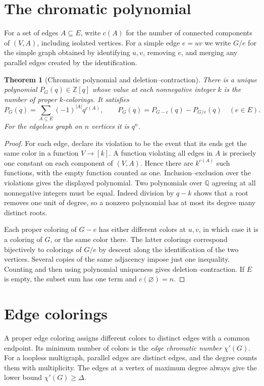 \documentclass[11pt,oneside,openany]{book}
\theoremstyle{plain}
\newtheorem{theorem}{Theorem}[chapter]
\theoremstyle{definition}
\theoremstyle{remark}
\begin{document}
\section{The chromatic polynomial}

For a set of edges \(A\subseteq E\), write \(c(A)\) for the number
of connected components of \((V,A)\), including isolated vertices.
For a simple edge \(e=uv\) we write \(G/e\) for the simple graph
obtained by identifying \(u,v\), removing \(e\), and merging any
parallel edges created by the identification.

\begin{theorem}[Chromatic polynomial and deletion--contraction]
\label{p204:W60}
There is a unique polynomial \(P_G(q)\in\mathbb Z[q]\) whose value
at each nonnegative integer \(k\) is the number of proper
\(k\)-colorings. It satisfies
\[
 P_G(q)=\sum_{A\subseteq E}(-1)^{|A|}q^{c(A)},\qquad
 P_G(q)=P_{G-e}(q)-P_{G/e}(q) \quad (e\in E).
\]
For the edgeless graph on \(n\) vertices it is \(q^n\).
\end{theorem}
\begin{proof}
For each edge, declare its violation to be the event that its ends
get the same color in a function \(V\to[k]\). A function violating
all edges in \(A\) is precisely one constant on each component of
\((V,A)\). Hence there are \(k^{c(A)}\) such functions, with the
empty function counted as one. Inclusion--exclusion over the
violations gives the displayed polynomial. Two polynomials over
\(\mathbb Q\) agreeing at all nonnegative integers must be equal.
Indeed division by \(q-k\) shows that a root removes one unit of
degree, so a nonzero polynomial has at most its degree many
distinct roots.

Each proper coloring of \(G-e\) has either different colors at
\(u,v\), in which case it is a coloring of \(G\), or the same
color there. The latter colorings correspond bijectively to
colorings of \(G/e\) by descent along the identification of the
two vertices. Several copies of the same adjacency impose just
one inequality. Counting and then using polynomial uniqueness
gives deletion--contraction. If \(E\) is empty, the subset sum has
one term and \(c(\varnothing)=n\).
\end{proof}

\section{Edge colorings}

A proper edge coloring assigns different colors to distinct edges
with a common endpoint. Its minimum number of colors is the
\emph{edge chromatic number} \(\chi'(G)\). For a loopless multigraph,
parallel edges are distinct edges, and the degree counts them with
multiplicity. The edges at a vertex of maximum degree always give
the lower bound \(\chi'(G)\ge\Delta\).
\end{document}
